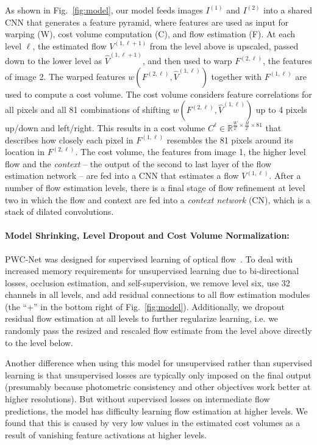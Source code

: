 \documentclass[runningheads]{llncs}
\newcommand{\level}{\ell}
\begin{document}
As shown in Fig.~\ref{fig:model}, our model feeds images $I^{(1)}$ and $I^{(2)}$ into a shared CNN that generates a feature pyramid, where features are used as input for warping (W), cost volume computation (C), and flow estimation (F). At each level $\level$, the estimated flow $V^{(1, \level+1)}$ from the level above is upscaled, passed down to the lower level as $\hat{V}^{(1, \level+1)}$, and then used to warp $F^{(2, \level)}$, the features of image 2. The warped features $w(F^{(2, \level)}, \hat{V}^{(1, \level)})$ together with $F^{(1, \level)}$ are used to compute a cost volume.
The cost volume considers feature correlations for all pixels and all 81 combinations of shifting $w(F^{(2, \level)}, \hat{V}^{(1, \level)})$ up to 4 pixels up/down and left/right.
This results in a cost volume $C^{\level}\in\mathbb{R}^{\frac{W}{2^\level} \times \frac{H}{2^\level} \times 81}$ that describes how closely each pixel in $F^{(1, \level)}$ resembles the 81 pixels around its location in $F^{(2, \level)}$.
The cost volume, the features from image 1, the higher level flow and the \emph{context} -- the output of the second to last layer of the flow estimation network -- are fed into a CNN that estimates a flow $V^{(1, \level)}$.
After a number of flow estimation levels, there is a final stage of flow refinement at level two in which the flow and context are fed into a \emph{context network} (CN), which is a stack of dilated convolutions.

\paragraph{Model Shrinking, Level Dropout and Cost Volume Normalization:} PWC-Net was designed for supervised learning of optical flow~\cite{Sun2018PWCNet}. To deal with increased memory requirements for unsupervised learning due to bi-directional losses, occlusion estimation, and self-supervision, we remove level six, use 32 channels in all levels, and add residual connections to all flow estimation modules (the ``+'' in the bottom right of Fig.~\ref{fig:model}). Additionally, we dropout residual flow estimation at all levels to further regularize learning, i.e. we randomly pass the resized and rescaled flow estimate from the level above directly to the level below.

Another difference when using this model for unsupervised rather than supervised learning is that unsupervised losses are typically only imposed on the final output (presumably because photometric consistency and other objectives work better at higher resolutions). But without supervised losses on intermediate flow predictions, the model has difficulty learning flow estimation at higher levels. We found that this is caused by very low values in the estimated cost volumes as a result of vanishing feature activations at higher levels.
\end{document}
